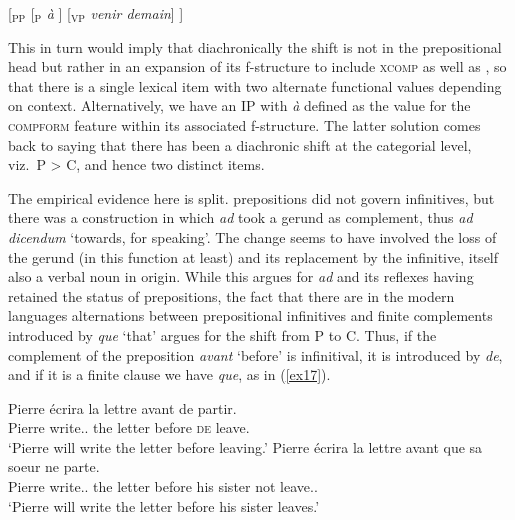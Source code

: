 \documentclass[output=paper]{langsci/langscibook}
\begin{document}

\begin{exe}
\ex\label{ex16} [$_{\textrm {PP}}$ [$_{\textrm{P}}$ \emph{\`a} ] [$_{\textrm{VP}}$ \emph{venir demain}] ]
\end{exe}

This in turn would imply that diachronically the shift is not in the
prepositional head but rather in an expansion of its f-structure to include
\textsc{xcomp} as well as \Obl{}, so that there is a single lexical item with
two alternate functional values depending on context. Alternatively, we have an
IP with \emph{\`a} defined as the value for the \textsc{compform} feature
within its associated f-structure. The latter solution comes back to saying
that there has been a diachronic shift at the categorial level, viz.\ P > C,
and hence two distinct items.

The empirical evidence here is split.  prepositions did not govern
infinitives, but there was a construction in which \emph{ad} took a gerund as
complement, thus \emph{ad dicendum} `towards, for speaking'. The change seems
to have involved the loss of the gerund (in this function at least) and its
replacement by the infinitive, itself also a verbal noun in origin. While this
argues for \emph{ad} and its  reflexes having retained the status of
prepositions, the fact that there are in the modern languages alternations
between prepositional infinitives and finite complements introduced by
\emph{que} `that' argues for the shift from P to C. Thus, if the complement of
the preposition \emph{avant} `before' is infinitival, it is introduced by
\emph{de}, and if it is a finite clause we have \emph{que}, as in
(\ref{ex17}).\newpage

\begin{exe}
\ex\label{ex17} 
\begin{xlist}
\ex\label{ex17a}
\gll Pierre \'ecrira  la lettre avant de partir.\\
Pierre write.\Fut.\Tsg{} the letter before \textsc{de} leave.\Inf{}\\
\trans \enquote*{Pierre will write the letter before leaving.}
\ex\label{ex17b}
\gll Pierre \'ecrira la 	lettre avant que sa soeur ne parte.\\
Pierre write.\Fut.\Tsg{} the letter before \Comp{} his sister not leave.\Sbjv.\Sg{}\\
\trans \enquote*{Pierre will write the letter before his sister leaves.}
\end{xlist}
\end{exe}
\end{document}
